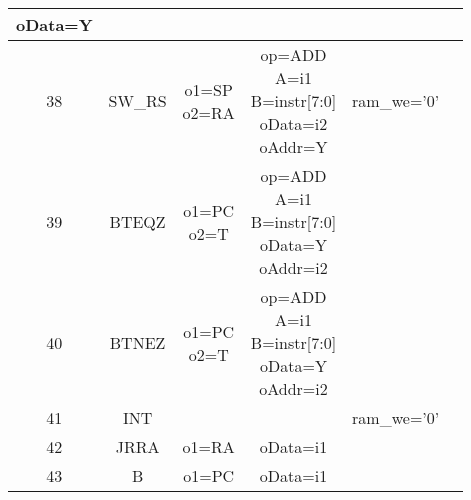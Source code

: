 \documentclass[10pt]{article}
\makeatletter
\newcommand{\zcell}[2]{\begin{tabular}{@{}#1@{}}#2\end{tabular}}
\makeatother
\begin{document}
\begin{center}
\begin{longtable}{|c|c|c|c|c|c|}
{								   oData=Y}           &                         &    \\\hline
38 & SW\_RS    &\zcell{c}{o1=SP\\
				o2=RA}            &\zcell{c}{op=ADD\\
								   A=i1\\B=instr[7:0]\\
								   oData=i2\\
								   oAddr=Y}           &ram\_we='0'              &    \\\hline
39 & BTEQZ     &\zcell{c}{o1=PC\\
				o2=T}             &\zcell{c}{op=ADD\\
								   A=i1\\B=instr[7:0]\\
								   oData=Y\\
								   oAddr=i2}          &                         &    \\\hline
40 & BTNEZ     &\zcell{c}{o1=PC\\
				o2=T       }      &\zcell{c}{op=ADD\\
								   A=i1\\B=instr[7:0]\\
								   oData=Y\\
								   oAddr=i2}          &                         &    \\\hline
41 & INT       &                  &                   &ram\_we='0'              &    \\\hline
42 & JRRA      &o1=RA             &oData=i1           &                         &    \\\hline
43 & B         &o1=PC             &oData=i1           &                         &    \\\hline


\end{longtable}
\end{center}
\end{document}
